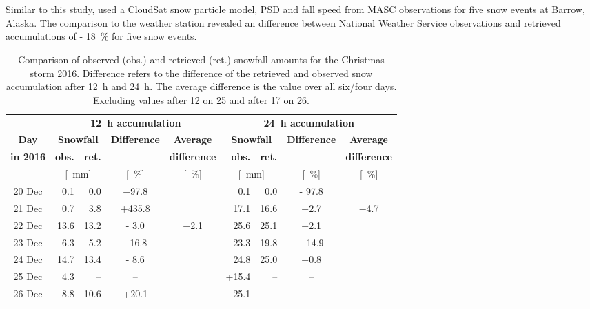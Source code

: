 \\
\\
Similar to this study, \citet{cooper_variational_2017} used a CloudSat snow particle model, PSD and fall speed from MASC observations for five snow events at Barrow, Alaska. The comparison to the weather station revealed an difference between National Weather Service observations and retrieved accumulations of \SI{- 18}{\percent} for five snow events.
\begin{table}[t!]
	\begin{center}
		\caption{Comparison of observed (obs.) and retrieved (ret.) snowfall amounts for the Christmas storm 2016. Difference refers to the difference of the retrieved and observed snow accumulation after \SI{12}{\hour} and \SI{24}{\hour}. The average difference is the value over all six/four days. Excluding values after \SI{12}{\UTC} on \SI{25}{\dec} and after \SI{17}{\UTC} on \SI{26}{\dec}.}\label{tab:res:ret_error}
		\begin{tabular}{c||r|r|c|c||r|r|c|c}
			\hline \hline
			& \multicolumn{4}{c||}{\textbf{\SI{12}{\hour} accumulation}} & \multicolumn{4}{c}{\textbf{\SI{24}{\hour} accumulation}}    \\ \cline{2-9}
			\textbf{Day} & \multicolumn{2}{c|}{\textbf{Snowfall}} & \textbf{Difference} & \textbf{Average} &  \multicolumn{2}{c|}{\textbf{Snowfall}} & \textbf{Difference} & \textbf{Average}  \\\cline{2-3} \cline{6-7}
			\textbf{in 2016} & \textbf{obs.} & \textbf{ret.} & & \textbf{difference} & \textbf{obs.} & \textbf{ret.} & & \textbf{difference} \\\cline{2-9}
			& \multicolumn{2}{c|}{[\SI{}{\mm}]} & [\SI{}{\percent}] & [\SI{}{\percent}] & \multicolumn{2}{c|}{[\SI{}{\mm}]} & [\SI{}{\percent}] & [\SI{}{\percent}] \\ \hline\hline
			\num{20} Dec & \num{0.1} &\num{0.0} & \num{-97.8} & & \num{0.1} & \num{0.0} & \num{- 97.8} &  \\\cline{1-9}
			\num{21} Dec & \num{0.7} & \num{3.8} & +\num{435.8} &  & \num{17.1} & \num{16.6} & \num{-2.7} & \multirow{4}{*}{\num{-4.7}}   \\\cline{1-5}\cline{6-8}
			\num{22} Dec & \num{13.6}& \num{13.2} & \num{- 3.0} & \multirow{5}{*}{\num{-2.1}} & \num{25.6} &\num{25.1} & \num{-2.1} &   \\\cline{1-4}\cline{6-8}
			\num{23} Dec & \num{6.3} &\num{5.2} & \num{- 16.8} & & \num{23.3}& \num{19.8} & \num{-14.9} &   \\\cline{1-4}\cline{6-8}
			\num{24} Dec & \num{14.7} & \num{13.4} & \num{- 8.6} && \num{24.8} & \num{25.0} & +\num{0.8} &   \\\cline{1-4}\cline{6-9}
			\num{25} Dec &  \num{4.3} & -- & -- & & +\num{15.4} & -- & -- & \\\cline{1-4}\cline{6-9}
			\num{26} Dec & \num{8.8} & \num{10.6} & +\num{20.1} &  &  \num{25.1} &-- & -- &  \\\hline\hline
		\end{tabular}
	\end{center}
\end{table}
